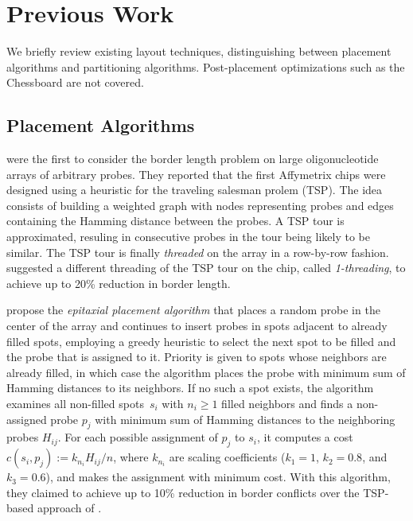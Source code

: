 \documentclass{bioinfo}
\newcommand{\ignore}[1]{}
\begin{document}
\section{Previous Work}
\label{sec:previous_work}

We briefly review existing layout techniques, distinguishing between placement algorithms and partitioning algorithms. Post-placement optimizations such as the Chessboard \citep{KAHNG02} are not covered.

\subsection{Placement Algorithms}
\label{sec:placement_alg}

\ignore{The first to formally address the border length problem were \citet{FELDMAN93}. They showed how an optimal placement can be constructed based on a two-dimensional Gray code. However, their work is restricted to \emph{uniform arrays} (arrays containing all possible probes of a given length) and synchronous embeddings.}

\citet{HANNENHALLI02} were the first to consider the border length problem on large oligonucleotide arrays of arbitrary probes. They reported that the first Affymetrix chips were designed using a heuristic for the traveling salesman prolem (TSP). The idea consists of building a weighted graph with nodes representing probes and edges containing the Hamming distance between the probes. A TSP tour is approximated, resuling in consecutive probes in the tour being likely to be similar. The TSP tour is finally \emph{threaded} on the array in a row-by-row fashion. \citet{HANNENHALLI02} suggested a different threading of the TSP tour on the chip, called \emph{1-threading}, to achieve up to 20\% reduction in border length.

\citet{KAHNG02} propose the \emph{epitaxial placement algorithm} that
places a random probe in the center of the array and continues to
insert probes in spots adjacent to already filled spots, employing a
greedy heuristic to select the next spot to be filled and the probe
that is assigned to it. Priority is given to spots whose
neighbors are already filled, in which case the algorithm places the
probe with minimum sum of Hamming distances to its neighbors. If no
such a spot exists, the algorithm examines all non-filled spots~$s_i$
with $n_i \geq 1$ filled neighbors and finds a non-assigned probe
$p_j$ with minimum sum of Hamming distances to the neighboring probes
$H_{ij}$. For each possible assignment of $p_j$ to $s_i$, it computes
a cost $c(s_i,p_j) := k_{n_i} H_{ij} / n$, where $k_{n_i}$ are scaling
coefficients ($k_1 = 1$, $k_2 = 0.8$, and $k_3 = 0.6$), and makes the
assignment with minimum cost. With this algorithm, they claimed to
achieve up to 10\% reduction in border conflicts over the TSP-based
approach of \citet{HANNENHALLI02}.
\end{document}
